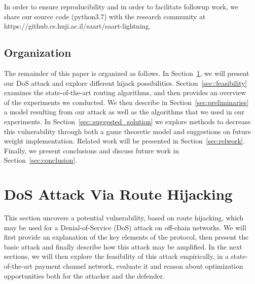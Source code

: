 In order to ensure reproducibility and in order to facilitate followup work,
we share our source code (python3.7) with the research community at https://github.cs.huji.ac.il/saart/saart-lightning.

\subsection{Organization}

The remainder of this paper is organized as follows.
In Section~\ref{sec:attack}, we will present our DoS attack
and explore different hijack possibilities.
Section~\ref{sec::feasibility} examines the state-of-the-art
routing algorithms, and then provides an overview of the experiments we conducted. We then describe in Section~\ref{sec:preliminaries} a model resulting from our attack
as well as the algorithms that we used in our experiments. In Section~\ref{sec::suggested_solution} we explore methods to decrease this vulnerability through both a game theoretic model and suggestions on future weight implementation. Related work will be presented in
Section~\ref{sec:relwork}.
Finally, we present conclusions and discuss future work in Section~\ref{sec:conclusion}.

\section{DoS Attack Via Route Hijacking}\label{sec:attack}

This section uncovers a potential vulnerability, based on route hijacking,
which may be used for
a Denial-of-Service (DoS) attack on off-chain networks.
We will first provide an explanation of the key elements of the protocol,
then present the basic attack and finally
describe how this attack may be amplified.
In the next sections, we will then explore the feasibility of this attack empirically,
in a state-of-the-art payment channel network, 
evaluate it and reason about optimization opportunities both for the attacker
and the defender.


